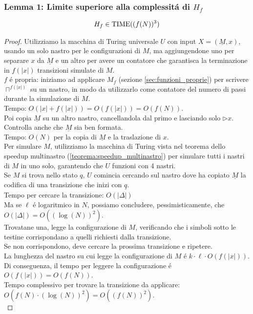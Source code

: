 \subsubsection{Lemma 1: Limite superiore alla complessitá di $H_f$}
\[H_f \in \text{TIME}((f(N))^3)\]
\begin{proof}
Utilizziamo la macchina di Turing universale $U$ con input $X = (\underline{M}, x)$, usando un solo nastro per le configurazioni di $M$,
ma aggiungendone uno per separare $x$ da $\underline{M}$ 
e un altro per avere un contatore che garantisca la terminazione 
in $f(|x|)$ transizioni simulate di $M$. \\

$f$ é propria: iniziamo ad applicare $M_f$ (sezione \ref{sec:funzioni_proprie}) per scrivere $\sqcap^{f(|x|)}$ su un nastro, 
in modo da utilizzarlo come contatore del numero di passi durante la simulazione di $M$. \\
Tempo: $O(|x| + f(|x|)) = O(f(|x|)) = O(f(N))$. \\

Poi copia $\underline{M}$ su un altro nastro, cancellandola dal primo e lasciando solo $\triangleright x$. \\
Controlla anche che $\underline{M}$ sia ben formata. \\
Tempo: $O(N)$ per la copia di $\underline{M}$ e la traslazione di $x$. \\

Per simulare $M$, utilizziamo la macchina di Turing vista nel teorema dello speedup multinastro (\ref{teorema:speedup_multinastro}) 
per simulare tutti i nastri di $M$ in uno solo, garantendo che $U$ funzioni con 4 nastri. \\

Se $M$ si trova nello stato $q$, $U$ comincia cercando sul nastro dove ha copiato $\underline{M}$ la codifica di una transizione che inizi con $\underline{q}$.\\
Tempo per cercare la transizione: $O(|\Delta|)$ \\
Ma se $\ell$ é logaritmico in $N$, possiamo concludere, pessimisticamente, che 
$O(|\Delta|) = O((\log(N))^2)$. \\

Trovatane una, legge la configurazione di $M$, verificando che i simboli sotto le testine corrispondano a quelli richiesti dalla transizione. \\
Se non corrispondono, deve cercare la prossima transizione e ripetere. \\
La lunghezza del nastro su cui legge la configurazione di $M$ é $k \cdot \ell \cdot O(f(|x|))$.
Di conseguenza, il tempo per leggere la configurazione é $O(f(|x|)) = O(f(N))$.\\
Tempo complessivo per trovare la transizione da applicare: $O(f(N) \cdot (\log(N))^2) = O((f(N))^2)$.\\


\end{proof}
